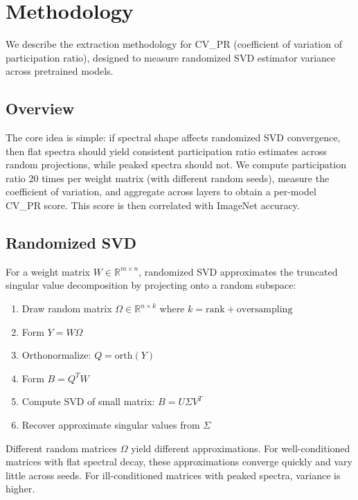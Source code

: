 \section{Methodology}
\label{sec:methodology}

We describe the extraction methodology for CV\_PR (coefficient of variation of participation ratio), designed to measure randomized SVD estimator variance across pretrained models.

\subsection{Overview}

The core idea is simple: if spectral shape affects randomized SVD convergence, then flat spectra should yield consistent participation ratio estimates across random projections, while peaked spectra should not. We compute participation ratio 20 times per weight matrix (with different random seeds), measure the coefficient of variation, and aggregate across layers to obtain a per-model CV\_PR score. This score is then correlated with ImageNet accuracy.

\subsection{Randomized SVD}

For a weight matrix $W \in \mathbb{R}^{m \times n}$, randomized SVD \citep{halko2011finding} approximates the truncated singular value decomposition by projecting onto a random subspace:

\begin{enumerate}
    \item Draw random matrix $\Omega \in \mathbb{R}^{n \times k}$ where $k = \text{rank} + \text{oversampling}$
    \item Form $Y = W\Omega$
    \item Orthonormalize: $Q = \text{orth}(Y)$
    \item Form $B = Q^T W$
    \item Compute SVD of small matrix: $B = U\Sigma V^T$
    \item Recover approximate singular values from $\Sigma$
\end{enumerate}

Different random matrices $\Omega$ yield different approximations. For well-conditioned matrices with flat spectral decay, these approximations converge quickly and vary little across seeds. For ill-conditioned matrices with peaked spectra, variance is higher.

